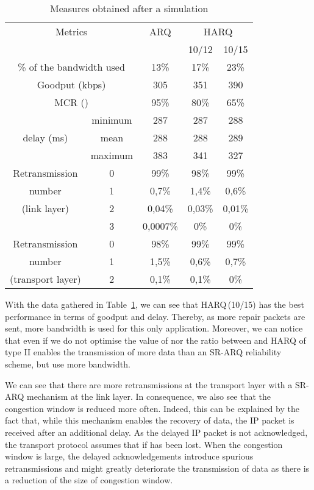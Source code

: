 \documentclass[conference,letterpaper]{IEEEtran}
\begin{document}
\begin{table}[h]
\caption{Measures obtained after a simulation}
\label{tab::out_of_simu}
\begin{center}
\begin{tabular}[h]{|c|c|c|c|c|}
\hline
\multicolumn{2}{|c|}{Metrics} & ARQ & \multicolumn{2}{|c|}{HARQ} \\
\cline{4-5}
\multicolumn{2}{|c|}{} & & 10/12 & 10/15 \\
\hline
\multicolumn{2}{|c|}{\% of the bandwidth used} & 13\% & 17\% & 23\% \\
\hline
\multicolumn{2}{|c|}{Goodput (kbps)} & 305 & 351 & 390 \\
\hline
\multicolumn{2}{|c|}{MCR ()} & 95\% & 80\% & 65\% \\
\hline
 & minimum & 287 & 287 & 288 \\
\cline{2-5}
delay (ms) & mean & 288 & 288 & 289 \\
\cline{2-5}
 & maximum & 383 & 341 & 327 \\
\hline
Retransmission & 0 & 99\% &  98\% &  99\% \\
\cline{2-5}
number & 1 & 0,7\% & 1,4\% & 0,6\% \\
\cline{2-5}
(link layer) & 2 & 0,04\% & 0,03\% & 0,01\% \\
\cline{2-5}
 & 3 & 0,0007\% & 0\% & 0\%\\
\hline
Retransmission & 0 & 98\% & 99\% & 99\% \\
\cline{2-5}
number & 1 & 1,5\% & 0,6\% & 0,7\% \\
\cline{2-5}
(transport layer) & 2 & 0,1\% & 0,1\% & 0\% \\
\hline
\end{tabular}
\end{center}
\end{table}

With the data gathered in Table~\ref{tab::out_of_simu}, we can see that HARQ\,(10/15) has the best performance in terms of goodput and delay. Thereby, as more repair packets are sent, more bandwidth is used for this only application. Moreover, we can notice that even if we do not optimise the value of  nor the ratio between  and  HARQ of type II enables the transmission of more data than an SR-ARQ reliability scheme, but use more bandwidth. 

We can see that there are more retransmissions at the transport layer with a SR-ARQ mechanism at the link layer. In consequence, we also see that the congestion window is reduced more often. Indeed, this can be explained by the fact that, while this mechanism enables the recovery of data, the IP packet is received after an additional delay. As the delayed IP packet is not acknowledged, the transport protocol assumes that if has been lost. When the congestion window is large, the delayed acknowledgements introduce spurious retransmissions and might greatly deteriorate the transmission of data as there is a reduction of the size of congestion window.
\end{document}
